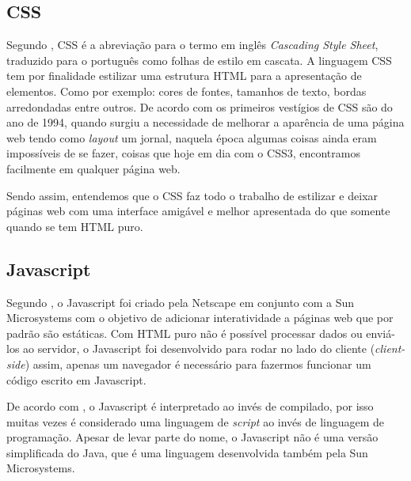 		\subsection{CSS}
		\par Segundo , CSS é a abreviação para o termo em inglês \textit{Cascading Style Sheet}, traduzido para o português como folhas de estilo em cascata. A linguagem CSS tem por finalidade estilizar uma estrutura HTML para a apresentação de elementos. Como por exemplo: cores de fontes, tamanhos de texto, bordas arredondadas entre outros. De acordo com  os primeiros vestígios de CSS são do ano de 1994, quando surgiu a necessidade de melhorar a aparência de uma página web tendo como \textit{layout} um jornal, naquela época algumas coisas ainda eram impossíveis de se fazer, coisas que hoje em dia com o CSS3, encontramos facilmente em qualquer página web.
		\par Sendo assim, entendemos que o CSS faz todo o trabalho de estilizar e deixar páginas web com uma interface amigável e melhor apresentada do que somente quando se tem HTML puro.
		\subsection{Javascript}
		\par Segundo , o Javascript foi criado pela Netscape em conjunto com a Sun Microsystems com o objetivo de adicionar interatividade a páginas web que por padrão são estáticas. Com HTML puro não é possível processar dados ou enviá-los ao servidor, o Javascript foi desenvolvido para rodar no lado do cliente (\textit{client-side}) assim, apenas um navegador é necessário para fazermos funcionar um código escrito em Javascript.
		\par De acordo com , o Javascript é interpretado ao invés de compilado, por isso muitas vezes é considerado uma linguagem de \textit{script} ao invés de linguagem de programação. Apesar de levar parte do nome, o Javascript não é uma versão simplificada do Java, que é uma linguagem desenvolvida também pela Sun Microsystems.
		
